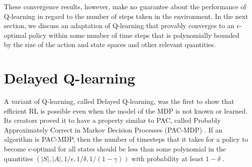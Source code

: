 \documentclass{article} %
\begin{document}

These convergence results, however, make no guarantee about the performance of Q-learning in regard to the number of steps taken in the environment.  In the next section, we discuss an adaptation of Q-learning that provably converges to an $\epsilon$-optimal policy within some number of time steps that is polynomially bounded by the size of the action and state spaces and other relevant quantities.

\section{Delayed Q-learning}
A variant of Q-learning, called Delayed Q-learning, was the first to show that efficient RL is possible even when the model of the MDP is not known or learned.  Its creators proved it to have a property similar to PAC, called Probably Approximately Correct in Markov Decision Processes (PAC-MDP) \cite{strehl_pac_2006}.  If an algorithm is PAC-MDP, then the number of timesteps that it takes for a policy to become $\epsilon$-optimal for all states should be less than some polynomial in the quantities $(\left|S\right|,\left|A\right|,1/\epsilon,1/\delta,1/(1-\gamma))$ with probability at least $1-\delta$ \cite{kakade}.
\end{document}
